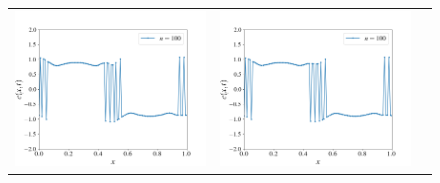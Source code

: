 \documentclass[12pt, reqno]{report}
\theoremstyle{definition}
\theoremstyle{remark}
\begin{document}
\begin{figure}[H]
\begin{tabular}{ccc}
        \includegraphics[width = \acfdwidth]{media_paper/stable_CH_CN_100} &
        \includegraphics[width = \acfdwidth]{media_paper/unstable_CH_CN_100} \\

\end{tabular}
\end{figure}
\end{document}
